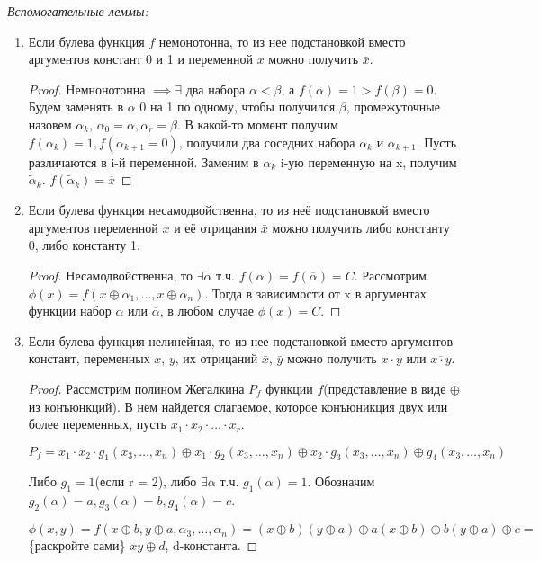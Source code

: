 \textit{Вспомогательные леммы:}
\begin{enumerate}
    \item Если булева функция $f$ немонотонна, то из нее подстановкой вместо аргументов констант 0 и 1 и переменной $x$ можно получить $\bar{x}$.
    
    \begin{proof}
        Немнонотонна $\implies \exists$ два набора $\alpha < \beta$, а $f(\alpha) = 1 > f(\beta) = 0$. Будем заменять в $\alpha$ 0 на 1 по одному, чтобы получился $\beta$, промежуточные назовем $\alpha_k$, $\alpha_0=\alpha, \alpha_r=\beta$. В какой-то момент получим $f(\alpha_k) = 1, f(\alpha_{k+1} = 0)$, получили два соседних набора $\alpha_k$ и $\alpha_{k+1}$. Пусть различаются в i-й переменной. Заменим в $\alpha_k$ i-ую переменную на x, получим $\tilde{\alpha}_k$. $f(\tilde{\alpha}_k) = \overline{x}$
    \end{proof}
    \item Если булева функция несамодвойственна, то из неё подстановкой вместо аргументов переменной $x$ и её отрицания $\bar{x}$ можно получить либо константу 0, либо константу 1.
    
    \begin{proof}
        Несамодвойственна, то $\exists \alpha$ т.ч. $f(\alpha)=f(\overline{\alpha})=C$. Рассмотрим $\phi(x) = f(x \oplus \alpha_1, \dots, x \oplus \alpha_n)$. Тогда в зависимости от x в аргументах функции набор $\alpha$ или $\overline{\alpha}$, в любом случае $\phi(x) = C$.
    \end{proof}
    \item Если булева функция нелинейная, то из нее подстановкой вместо аргументов констант, переменных $x$, $y$, их отрицаний $\bar{x}$, $\bar{y}$ можно получить $x \cdot y$ или $\overline{x \cdot y}$.
    
    \begin{proof}
        Рассмотрим полином Жегалкина $P_f$ функции $f$(представление в виде $\oplus$ из конъюнкций). В нем найдется слагаемое, которое конъюникция двух или более переменных, пусть $x_1 \cdot x_2 \cdot \dots \cdot x_r$.
        
        $P_f = x_1 \cdot x_2 \cdot g_1(x_3, \dots, x_n) \oplus x_1 \cdot g_2(x_3, \dots, x_n) \oplus x_2 \cdot g_3(x_3, \dots, x_n) \oplus g_4(x_3, \dots, x_n)$
        
        Либо $g_1 = 1$(если r = 2), либо $\exists \alpha$ т.ч. $g_1(\alpha) = 1$. Обозначим $g_2(\alpha) = a, g_3(\alpha) = b, g_4(\alpha) = c$.
        
        $\phi(x, y) = f(x \oplus b, y \oplus a, \alpha_3, \dots , \alpha_n) = (x \oplus b)(y \oplus a) \oplus a(x \oplus b) \oplus b(y \oplus a) \oplus c = $\{раскройте сами\} $xy \oplus d$, d-константа.
    \end{proof}
\end{enumerate}

